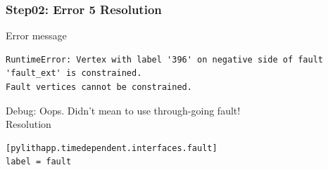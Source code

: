 \documentclass{beamer}
\newcommand{\errlabel}[1]{{\small \color{blue}#1}}
\newcommand{\debuginfo}[1]{{\small \color{green}#1}}
\begin{document}
\begin{frame}[fragile]
  \frametitle{Step02: Error 5 Resolution}

\errlabel{Error message}
\begin{lstlisting}
RuntimeError: Vertex with label '396' on negative side of fault 'fault_ext' is constrained.
Fault vertices cannot be constrained.
\end{lstlisting}\pause
\errlabel{Debug:} \debuginfo{Oops. Didn't mean to use through-going fault!}\pause\\
\errlabel{Resolution}
\begin{lstlisting}
[pylithapp.timedependent.interfaces.fault]
label = fault
\end{lstlisting}

\end{frame}
\end{document}
